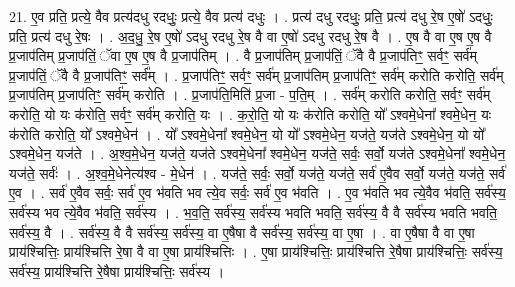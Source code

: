 \documentclass[17pt]{extarticle}
\begin{document}
21. ए॒व प्रति॒ प्रत्ये॒ वैव प्रत्य॑दधु रदधुः॒ प्रत्ये॒ वैव प्रत्य॑ दधुः । . प्रत्य॑ दधु रदधुः॒ प्रति॒ प्रत्य॑ दधु रे॒ष ए॒षो॑ ऽदधुः॒ प्रति॒ प्रत्य॑ दधु रे॒षः । . अ॒द॒धु॒ रे॒ष ए॒षो॑ ऽदधु रदधु रे॒ष वै वा ए॒षो॑ ऽदधु रदधु रे॒ष वै । . ए॒ष वै वा ए॒ष ए॒ष वै प्र॒जाप॑तिम् प्र॒जाप॑तिं॒ ॅवा ए॒ष ए॒ष वै प्र॒जाप॑तिम् । . वै प्र॒जाप॑तिम् प्र॒जाप॑तिं॒ ॅवै वै प्र॒जाप॑तिꣳ॒॒ सर्वꣳ॒॒ सर्व॑म् प्र॒जाप॑तिं॒ ॅवै वै प्र॒जाप॑तिꣳ॒॒ सर्व᳚म् । . प्र॒जाप॑तिꣳ॒॒ सर्वꣳ॒॒ सर्व॑म् प्र॒जाप॑तिम् प्र॒जाप॑तिꣳ॒॒ सर्व॑म् करोति करोति॒ सर्व॑म् प्र॒जाप॑तिम् प्र॒जाप॑तिꣳ॒॒ सर्व॑म् करोति । . प्र॒जाप॑ति॒मिति॑ प्र॒जा - प॒ति॒म् । . सर्व॑म् करोति करोति॒ सर्वꣳ॒॒ सर्व॑म् करोति॒ यो यः क॑रोति॒ सर्वꣳ॒॒ सर्व॑म् करोति॒ यः । . क॒रो॒ति॒ यो यः क॑रोति करोति॒ यो᳚ ऽश्वमे॒धेना᳚ श्वमे॒धेन॒ यः क॑रोति करोति॒ यो᳚  ऽश्वमे॒धेन॑ । . यो᳚ ऽश्वमे॒धेना᳚ श्वमे॒धेन॒ यो यो᳚ ऽश्वमे॒धेन॒ यज॑ते॒ यज॑ते ऽश्वमे॒धेन॒ यो यो᳚ ऽश्वमे॒धेन॒ यज॑ते । . अ॒श्व॒मे॒धेन॒ यज॑ते॒ यज॑ते ऽश्वमे॒धेना᳚ श्वमे॒धेन॒ यज॑ते॒ सर्वः॒ सर्वो॒ यज॑ते ऽश्वमे॒धेना᳚ श्वमे॒धेन॒ यज॑ते॒ सर्वः॑ । . अ॒श्व॒मे॒धेनेत्य॑श्व - मे॒धेन॑ । . यज॑ते॒ सर्वः॒ सर्वो॒ यज॑ते॒ यज॑ते॒ सर्व॑ ए॒वैव सर्वो॒ यज॑ते॒ यज॑ते॒ सर्व॑ ए॒व । . सर्व॑ ए॒वैव सर्वः॒ सर्व॑ ए॒व भ॑वति भव त्ये॒व सर्वः॒ सर्व॑ ए॒व भ॑वति । . ए॒व भ॑वति भव त्ये॒वैव भ॑वति॒ सर्व॑स्य॒ सर्व॑स्य भव त्ये॒वैव भ॑वति॒ सर्व॑स्य । . भ॒व॒ति॒ सर्व॑स्य॒ सर्व॑स्य भवति भवति॒ सर्व॑स्य॒ वै वै सर्व॑स्य भवति भवति॒ सर्व॑स्य॒ वै । . सर्व॑स्य॒ वै वै सर्व॑स्य॒ सर्व॑स्य॒ वा ए॒षैषा वै सर्व॑स्य॒ सर्व॑स्य॒ वा ए॒षा । . वा ए॒षैषा वै वा ए॒षा प्राय॑श्चित्तिः॒ प्राय॑श्चित्ति रे॒षा वै वा ए॒षा प्राय॑श्चित्तिः । . ए॒षा प्राय॑श्चित्तिः॒ प्राय॑श्चित्ति रे॒षैषा प्राय॑श्चित्तिः॒ सर्व॑स्य॒ सर्व॑स्य॒ प्राय॑श्चित्ति रे॒षैषा प्राय॑श्चित्तिः॒ सर्व॑स्य । \newline
\end{document}
